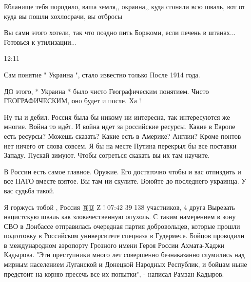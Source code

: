 
Ебланище тебя породило, ваша земля,, окраина,, куда сгоняли всю шваль, вот от
куда вы пошли хохлосрачи, вы отбросы


Вы сами этого хотели, так что поздно пить Боржоми, если печень в штанах...
Готовься к утилизации...

12:11

Сам понятие " Украина ", стало известно только После 1914 года.

ДО этого, * Украина * было чисто Географическим понятием. Чисто ГЕОГРАФИЧЕСКИМ,
оно будет и после. Ха !


Ну ты и дебил. Россия была бы никому ни интересна, так интересуются же многие.
Война то идёт. И война идет за российские ресурсы. Какие в Европе есть ресурсы?
Можешь сказать? Какие есть в Америке? Англии? Кроме понтов нет ничего от слова
совсем. Я бы на месте Путина перекрыл бы все поставки Западу. Пускай зимуют.
Чтобы согреться скакать вы их там научите.

В России есть самое главное. Оружие. Его достаточно чтобы и вас отпиздить и все
НАТО вместе взятое. Вы там ни скулите. Воюйте до последнего украинца. У вас
судьба такой.

Я горжусь тобой , Россия 🇷🇺 Z !
07:42
39 138 участников, 4 друга
Вырезать нацистскую шваль как злокачественную опухоль.
С таким намерением в зону СВО в Донбассе отправилась очередная партия добровольцев, которые прошли подготовку в Российском университете спецназа в Гудермесе.
Бойцов проводили в международном аэропорту Грозного имени Героя России Ахмата-Хаджи Кадырова.
"Эти преступники много лет совершенно безнаказанно глумились над мирным населением Луганской и Донецкой Народных Республик, и бойцам ныне предстоит на корню пресечь все их попытки", - написал Рамзан Кадыров.


